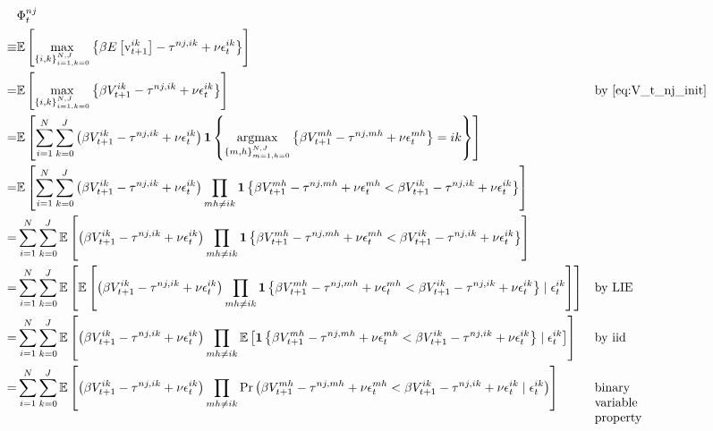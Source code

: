 \documentclass[10pt]{article}
\begin{document}
\begin{align}
    &\Phi_t^{n j} \\
    \equiv &\mathbb{E}\left[\max _{\{i, k\}_{i=1, k=0}^{N, J}}\left\{\beta E\left[\mathrm{v}_{t+1}^{i k}\right]-\tau^{n j, i k}+\nu \epsilon_t^{i k}\right\}\right] \\
    = &\mathbb{E}\left[\max _{\{i, k\}_{i=1, k=0}^{N, J}} \left\{ \beta V_{t+1}^{i k}-\tau^{n j, i k}+\nu \epsilon_t^{i k} \right\}\right] && \text{by \eqref{eq:V_t_nj_init}} \\
    = &\mathbb{E}\left[ \sum_{i = 1}^N \sum_{k = 0}^J \left(\beta V_{t+1}^{i k}-\tau^{n j, i k}+\nu \epsilon_t^{i k}\right) \mathbf{1}\left\{ \underset{{\{m, h\}_{m=1, h=0}^{N, J}}}{\text{argmax}} \left\{ \beta V_{t+1}^{m h}-\tau^{n j, m h}+\nu \epsilon_t^{m h} \right\} = i k \right\} \right] \\
    = &\mathbb{E}\left[ \sum_{i = 1}^N \sum_{k = 0}^J \left(\beta V_{t+1}^{i k}-\tau^{n j, i k}+\nu \epsilon_t^{i k}\right) \prod_{m h \neq i k} \mathbf{1}\left\{ \beta V_{t+1}^{m h}-\tau^{n j, m h}+\nu \epsilon_t^{m h} < \beta V_{t+1}^{i k}-\tau^{n j, i k}+\nu \epsilon_t^{i k} \right\} \right] \\
    = &\sum_{i=1}^N \sum_{k=0}^J \mathbb{E}\left[ \left(\beta V_{t+1}^{i k}-\tau^{n j, i k}+\nu \epsilon_t^{i k}\right) \prod_{m h \neq i k} \mathbf{1}\left\{ \beta V_{t+1}^{m h}-\tau^{n j, m h}+\nu \epsilon_t^{m h} < \beta V_{t+1}^{i k}-\tau^{n j, i k}+\nu \epsilon_t^{i k} \right\} \right] \\
    = &\sum_{i=1}^N \sum_{k=0}^J \mathbb{E}\left[ \mathbb{E} \left[ \left(\beta V_{t+1}^{i k}-\tau^{n j, i k}+\nu \epsilon_t^{i k}\right) \prod_{m h \neq i k} \mathbf{1}\left\{ \beta V_{t+1}^{m h}-\tau^{n j, m h}+\nu \epsilon_t^{m h} < \beta V_{t+1}^{i k}-\tau^{n j, i k}+\nu \epsilon_t^{i k} \right\} \mid \epsilon_t^{i k} \right] \right] && \text{by LIE} \\
    = &\sum_{i=1}^N \sum_{k=0}^J \mathbb{E}\left[ \left(\beta V_{t+1}^{i k}-\tau^{n j, i k}+\nu \epsilon_t^{i k}\right) \prod_{m h \neq i k} \mathbb{E} \left[ \mathbf{1}\left\{ \beta V_{t+1}^{m h}-\tau^{n j, m h}+\nu \epsilon_t^{m h} < \beta V_{t+1}^{i k}-\tau^{n j, i k}+\nu \epsilon_t^{i k} \right\} \mid \epsilon_t^{i k} \right] \right]  && \text{by iid}\\
    = &\sum_{i=1}^N \sum_{k=0}^J \mathbb{E}\left[ \left(\beta V_{t+1}^{i k}-\tau^{n j, i k}+\nu \epsilon_t^{i k}\right) \prod_{m h \neq i k} \Pr \left(\beta V_{t+1}^{m h}-\tau^{n j, m h}+\nu \epsilon_t^{m h} < \beta V_{t+1}^{i k}-\tau^{n j, i k}+\nu \epsilon_t^{i k} \mid \epsilon_t^{i k} \right) \right] && \parbox[t]{1.5cm}{\raggedright binary variable property}
\end{align}
\end{document}
